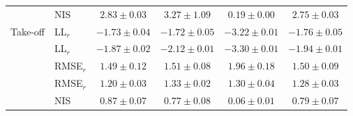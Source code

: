 \begin{table}[t]
\begin{tabular*}{\columnwidth}{@{\extracolsep{\fill}}llcccc@{}}
      & NIS           & $2.83{\pm}0.03$ & $3.27{\pm}1.09$ & $0.19{\pm}0.00$ & $\mathbf{2.75{\pm}0.03}$ \\
\addlinespace
Take-off & LL$_r$        & $-1.73{\pm}0.04$ & $\mathbf{-1.72{\pm}0.05}$ & $-3.22{\pm}0.01$ & $-1.76{\pm}0.05$ \\
         & LL$_{\dot r}$ & $\mathbf{-1.87{\pm}0.02}$ & $-2.12{\pm}0.01$ & $-3.30{\pm}0.01$ & $-1.94{\pm}0.01$ \\
         & RMSE$_r$      & $\mathbf{1.49{\pm}0.12}$ & $1.51{\pm}0.08$ & $1.96{\pm}0.18$ & $1.50{\pm}0.09$ \\
         & RMSE$_{\dot r}$ & $\mathbf{1.20{\pm}0.03}$ & $1.33{\pm}0.02$ & $1.30{\pm}0.04$ & $1.28{\pm}0.03$ \\
         & NIS           & $\mathbf{0.87{\pm}0.07}$ & $0.77{\pm}0.08$ & $0.06{\pm}0.01$ & $0.79{\pm}0.07$ \\
\bottomrule
\end{tabular*}
\end{table}
